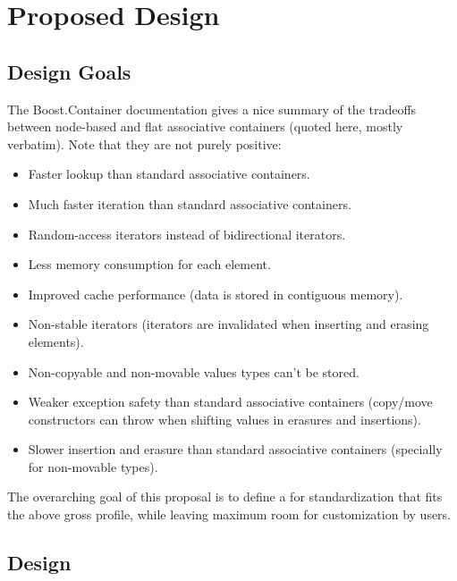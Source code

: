 \section{Proposed Design}

\subsection{Design Goals}

The Boost.Container documentation gives a nice summary of the tradeoffs
between node-based and flat associative containers (quoted here, mostly
verbatim).  Note that they are not purely positive:

\begin{itemize}
  \item Faster lookup than standard associative containers.

  \item Much faster iteration than standard associative
    containers.

  \item Random-access iterators instead of bidirectional iterators.

  \item Less memory consumption for each element.

  \item Improved cache performance (data is stored in contiguous memory).

  \item Non-stable iterators (iterators are invalidated when inserting and
    erasing elements).

  \item Non-copyable and non-movable values types can't be stored.

  \item Weaker exception safety than standard associative containers
    (copy/move constructors can throw when shifting values in erasures and
    insertions).

  \item Slower insertion and erasure than standard associative containers
    (specially for non-movable types).
\end{itemize}

The overarching goal of this proposal is to define a  for
standardization that fits the above gross profile, while leaving maximum room
for customization by users.

\subsection{Design}

